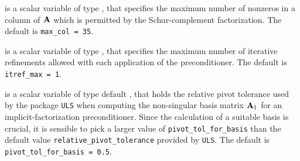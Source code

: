 \documentclass{galahad}
\begin{document}
\begin{description}
 is a scalar variable of type \integer, that specifies
the maximum number of nonzeros in a column of ${\mathbf{A}}$ which is permitted
by the Schur-complement factorization.
The default is {\tt max\_col = 35}.




 is a scalar variable of type \integer, that specifies
the maximum number of iterative refinements allowed with each application
of the preconditioner.
The default is {\tt itref\_max = 1}.




 is a scalar variable of type default
\realdp, that holds the relative
pivot tolerance used by the package {\tt ULS}
when computing the non-singular basis matrix ${\mathbf{A}}_1$ for
an implicit-factorization preconditioner. Since the calculation of a
suitable basis is crucial, it is sensible to pick a larger
value of {\tt pivot\_tol\_for\_basis} than
the default value {\tt relative\_pivot\_tolerance} provided by {\tt ULS}.
The default is {\tt pivot\_tol\_for\_basis = 0.5}.



\end{description}
\end{document}
